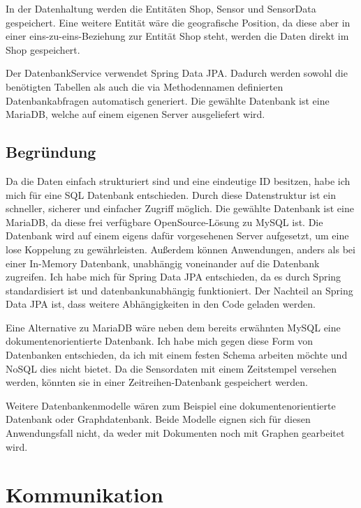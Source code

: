\documentclass[runningheads]{llncs}
\begin{document}
In der Datenhaltung werden die Entitäten Shop, Sensor und SensorData gespeichert.
Eine weitere Entität wäre die geografische Position, da diese aber in einer eins-zu-eins-Beziehung zur Entität Shop steht, werden die Daten direkt im Shop gespeichert.

Der DatenbankService verwendet Spring Data JPA.
Dadurch werden sowohl die benötigten Tabellen als auch die via Methodennamen definierten Datenbankabfragen automatisch generiert.
Die gewählte Datenbank ist eine MariaDB, welche auf einem eigenen Server ausgeliefert wird.


\subsection{Begründung}
Da die Daten einfach strukturiert sind und eine eindeutige ID besitzen, habe ich mich für eine SQL Datenbank entschieden.
Durch diese Datenstruktur ist ein schneller, sicherer und einfacher Zugriff möglich.
Die gewählte Datenbank ist eine MariaDB, da diese frei verfügbare OpenSource-Lösung zu MySQL ist.
Die Datenbank wird auf einem eigens dafür vorgesehenen Server aufgesetzt, um eine lose Koppelung zu gewährleisten. Außerdem können Anwendungen, anders als bei einer In-Memory Datenbank, unabhängig voneinander auf die Datenbank zugreifen.
Ich habe mich für Spring Data JPA entschieden, da es durch Spring standardisiert ist und datenbankunabhängig funktioniert. Der Nachteil an Spring Data JPA ist, dass weitere Abhängigkeiten in den Code geladen werden.

Eine Alternative zu MariaDB wäre neben dem bereits erwähnten MySQL eine dokumentenorientierte Datenbank.
Ich habe mich gegen diese Form von Datenbanken entschieden, da ich mit einem festen Schema arbeiten möchte und NoSQL dies nicht bietet.
Da die Sensordaten mit einem Zeitstempel versehen werden, könnten sie in einer Zeitreihen-Datenbank gespeichert werden.

Weitere Datenbankenmodelle wären zum Beispiel eine dokumentenorientierte Datenbank oder Graphdatenbank. Beide Modelle eignen sich für diesen Anwendungsfall nicht, da weder mit Dokumenten noch mit Graphen gearbeitet wird.
\newpage

\section{Kommunikation}
\end{document}
